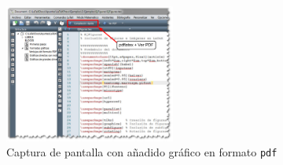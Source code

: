 \documentclass[11pt,a4paper]{article}
\begin{document}
\begin{figure}[hbt]
	\centering
	\includegraphics[width=0.5\textwidth]{texmk03} 
	\caption[Captura con gráfico en \texttt{pdf}]{Captura de pantalla con añadido gráfico en formato \texttt{pdf}}
	\label{fig:texmk03}
\end{figure}
\end{document}
